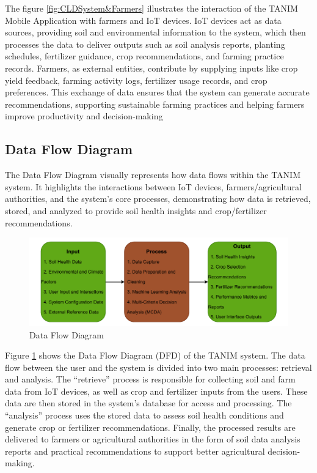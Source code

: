 {	The figure \ref{fig:CLDSystem&Farmers} illustrates the interaction of the TANIM Mobile Application with farmers and IoT devices. IoT devices act as data sources, providing soil and environmental information to the system, which then processes the data to deliver outputs such as soil analysis reports, planting schedules, fertilizer guidance, crop recommendations, and farming practice records. Farmers, as external entities, contribute by supplying inputs like crop yield feedback, farming activity logs, fertilizer usage records, and crop preferences. This exchange of data ensures that the system can generate accurate recommendations, supporting sustainable farming practices and helping farmers improve productivity and decision-making
	
	\subsection{Data Flow Diagram}
	The Data Flow Diagram visually represents how data flows within the TANIM system. It highlights the interactions between IoT devices, farmers/agricultural authorities, and the system’s core processes, demonstrating how data is retrieved, stored, and analyzed to provide soil health insights and crop/fertilizer recommendations.
	
	\begin{figure}[H]
		\centering
		\caption{Data Flow Diagram}
		\label{fig:DFD}
		\includegraphics[width=1\textwidth]{figures/IPO.pdf}
	\end{figure}
	
	Figure \ref{fig:DFD} shows the Data Flow Diagram (DFD) of the TANIM system. The data flow between the user and the system is divided into two main processes: retrieval and analysis. The “retrieve” process is responsible for collecting soil and farm data from IoT devices, as well as crop and fertilizer inputs from the users. These data are then stored in the system’s database for access and processing. The “analysis” process uses the stored data to assess soil health conditions and generate crop or fertilizer recommendations. Finally, the processed results are delivered to farmers or agricultural authorities in the form of soil data analysis reports and practical recommendations to support better agricultural decision-making.
	
}
